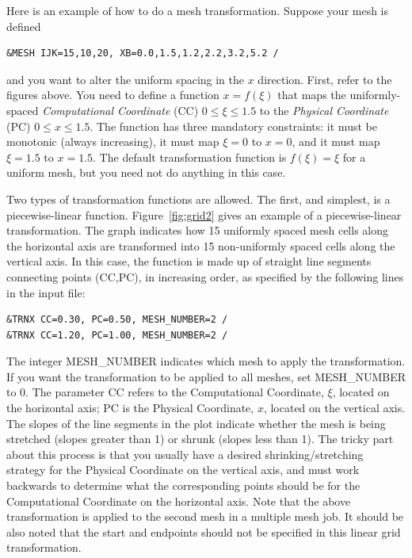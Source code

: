 \documentclass[11pt]{book}
\begin{document}
Here is an example of how to do a mesh transformation. Suppose your mesh is defined
\begin{lstlisting}
&MESH IJK=15,10,20, XB=0.0,1.5,1.2,2.2,3.2,5.2 /
\end{lstlisting}
and you want to alter the uniform spacing in the $x$ direction. First, refer to the figures above. You need to define a function $x = f(\xi)$ that maps the uniformly-spaced {\em Computational Coordinate} ({\ct CC}) $0 \le \xi \le 1.5$ to the {\em Physical Coordinate} ({\ct PC}) $0 \le x \le 1.5$. The function has three mandatory constraints: it must be monotonic (always increasing), it must map $\xi=0$ to $x=0$, and it must map $\xi=1.5$ to $x=1.5$. The default transformation function is $f(\xi) = \xi$ for a uniform mesh, but you need not do anything in this case.

Two types of transformation functions are allowed. The first, and simplest, is a piecewise-linear function. Figure~\ref{fig:grid2} gives an example of a piecewise-linear transformation. The graph indicates how 15 uniformly spaced mesh cells along the horizontal axis are transformed into 15 non-uniformly spaced cells along the vertical axis. In this case, the function is made up of straight line segments connecting points ({\ct CC},{\ct PC}), in increasing order, as specified by the following lines in the input file:
\begin{lstlisting}
&TRNX CC=0.30, PC=0.50, MESH_NUMBER=2 /
&TRNX CC=1.20, PC=1.00, MESH_NUMBER=2 /
\end{lstlisting}
The integer {\ct MESH\_NUMBER} indicates which mesh to apply the transformation. If you want the transformation to be applied to all meshes, set {\ct MESH\_NUMBER} to 0. The parameter {\ct CC} refers to the Computational Coordinate, $\xi$, located on the horizontal axis; {\ct PC} is the Physical Coordinate, $x$, located on the vertical axis.  The slopes of the line segments in the plot indicate whether the mesh is being stretched (slopes greater than 1) or shrunk (slopes less than 1). The tricky part about this process is that you usually have a desired shrinking/stretching strategy for the Physical Coordinate on the vertical axis, and must work backwards to determine what the corresponding points should be for the Computational Coordinate on the horizontal axis. Note that the above transformation is applied to the second mesh in a multiple mesh job.
It should be also noted that the start and endpoints should not be specified in this linear grid transformation.
\end{document}
